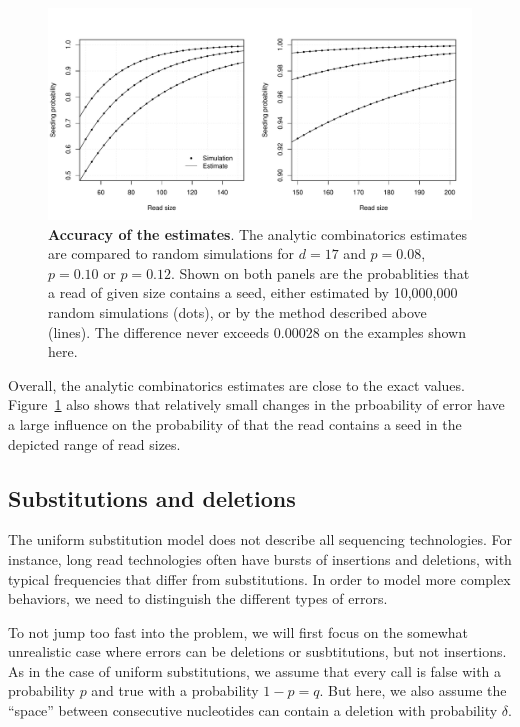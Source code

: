 \documentclass{article}
\begin{document}
\begin{figure}[h]
\centering
\includegraphics[scale=0.445]{simulp.pdf}
\caption{\textbf{Accuracy of the estimates}. The analytic combinatorics
estimates are compared to random simulations for $d=17$ and $p=0.08$,
$p=0.10$ or $p=0.12$. Shown on both panels are the probablities that a
read of given size contains a seed, either estimated by 10,000,000 random
simulations (dots), or by the method described above (lines). The
difference never exceeds 0.00028 on the examples shown here.}
\label{fig:simulp}
\end{figure}

Overall, the analytic combinatorics estimates are close to the exact
values. Figure~\ref{fig:simulp} also shows that relatively small changes
in the prboability of error have a large influence on the probability of
that the read contains a seed in the depicted range of read sizes.




\subsection{Substitutions and deletions}
\label{sec:deletions}

The uniform substitution model does not describe all sequencing
technologies. For instance, long read technologies often have bursts of
insertions and deletions, with typical frequencies that differ from
substitutions. In order to model more complex behaviors, we need to
distinguish the different types of errors.

To not jump too fast into the problem, we will first focus on the
somewhat unrealistic case where errors can be deletions or
susbtitutions, but not insertions. As in the case of uniform
substitutions, we assume that every call is false with a probability $p$
and true with a probability $1-p=q$. But here, we also assume the
``space''  between consecutive nucleotides can contain a deletion with
probability $\delta$.
\end{document}

